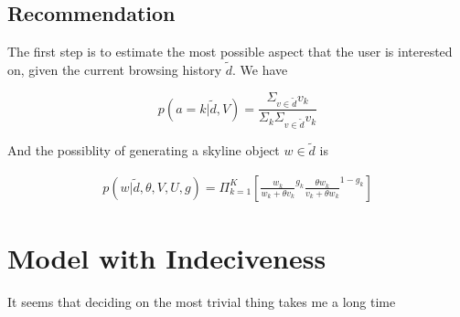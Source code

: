 \documentclass[sigconf]{acmart}
\begin{document}
\subsection{Recommendation}
The first step is to estimate the most possible aspect that the user is interested on, given the current browsing history $\tilde{d}$. We have

\begin{equation}\label{aprobability}
p(a=k|\tilde{d},V)=\frac{\Sigma_{v\in \tilde{d}} v_k}{\Sigma_k \Sigma_{v\in \tilde{d}} v_k}
\end{equation}

And the possiblity of generating a skyline object $w\in \tilde{d}$ is 

\begin{align}\label{equ:skylineprobability}
		p(w|\tilde{d},\theta,V,U,g) %
		= \Pi_{k=1}^{K}[ {\frac{w_k}{w_k+\theta v_k}}^{g_k} { \frac{\theta w_{k}}{v_{k}+\theta w_{k}}}^{1-g_k}]
\end{align}

\section{Model with Indeciveness}
It seems that deciding on the most trivial thing takes me a long time


\end{document}
